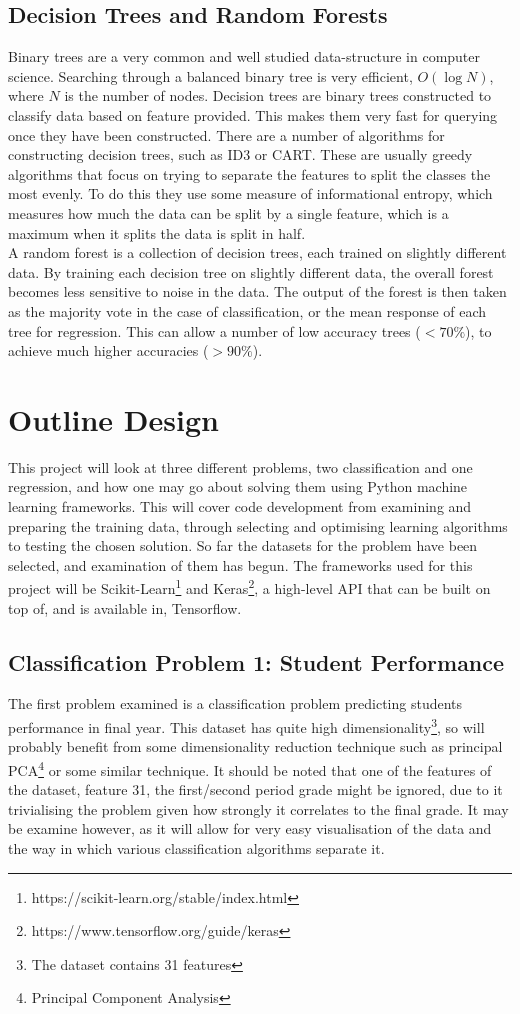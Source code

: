 \documentclass[12pt,a4paper,titlepage]{book}
\begin{document}
\section{Decision Trees and Random Forests}
	Binary trees are a very common and well studied data-structure in computer science. Searching through a balanced binary tree is very efficient, $O(\log N)$, where $N$ is the number of nodes. Decision trees are binary trees constructed to classify data based on feature provided. This makes them very fast for querying once they have been constructed. There are a number of algorithms for constructing decision trees, such as ID3\cite{ID3} or CART\cite{CART}. These are usually greedy algorithms that focus on trying to separate the features to split the classes the most evenly. To do this they use some measure of informational entropy, which measures how much the data can be split by a single feature, which is a maximum when it splits the data is split in half\cite{info-entropy}.\\
	A random forest is a collection of decision trees, each trained on slightly different data. By training each decision tree on slightly different data, the overall forest becomes less sensitive to noise in the data. The output of the forest is then taken as the majority vote in the case of classification, or the mean response of each tree for regression. This can allow a number of low accuracy trees ($<70\%$), to achieve much higher accuracies ($>90\%$).

\chapter{Outline Design}
	This project will look at three different problems, two classification and one regression, and how one may go about solving them using Python machine learning frameworks. This will cover code development from examining and preparing the training data, through selecting and optimising learning algorithms to testing the chosen solution. So far the datasets for the problem have been selected, and examination of them has begun. The frameworks used for this project will be Scikit-Learn\footnote{https://scikit-learn.org/stable/index.html} and Keras\footnote{https://www.tensorflow.org/guide/keras}, a high-level API that can be built on top of, and is available in, Tensorflow.
\section{Classification Problem 1: Student Performance}
	The first problem examined is a classification problem predicting students performance in final year\cite{student-performance-dataset}. This dataset has quite high dimensionality\footnote{The dataset contains 31 features}, so will probably benefit from some dimensionality reduction technique such as principal PCA\footnote{Principal Component Analysis} or some similar technique\cite{dimensional-reductions}. It should be noted that one of the features of the dataset, feature 31, the first/second period grade might be ignored, due to it trivialising the problem given how strongly it correlates to the final grade. It may be examine however, as it will allow for very easy visualisation of the data and the way in which various classification algorithms separate it.
\end{document}
